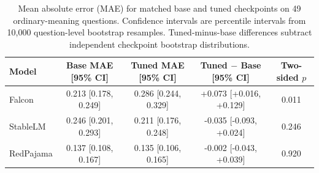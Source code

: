 \begin{table}[H]
\centering
\begin{tabular}{lcccc}
\hline
\textbf{Model} & \textbf{Base MAE [95\% CI]} & \textbf{Tuned MAE [95\% CI]} & \textbf{Tuned $-$ Base [95\% CI]} & \textbf{Two-sided $p$} \\
\hline
Falcon & 0.213 [0.178, 0.249] & 0.286 [0.244, 0.329] & +0.073 [+0.016, +0.129] & 0.011 \\
StableLM & 0.246 [0.201, 0.293] & 0.211 [0.176, 0.248] & -0.035 [-0.093, +0.024] & 0.246 \\
RedPajama & 0.137 [0.108, 0.167] & 0.135 [0.106, 0.165] & -0.002 [-0.043, +0.039] & 0.920 \\
\hline
\end{tabular}
\caption{Mean absolute error (MAE) for matched base and tuned checkpoints on 49 ordinary-meaning questions. Confidence intervals are percentile intervals from 10,000 question-level bootstrap resamples. Tuned-minus-base differences subtract independent checkpoint bootstrap distributions.}
\label{tab:base_vs_tuned_49q_replication}
\end{table}
